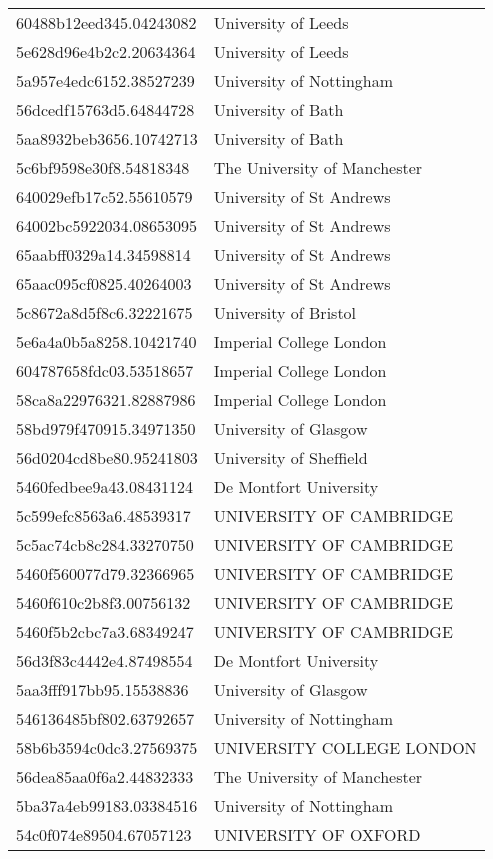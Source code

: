 \begin{tabular}{ll}
60488b12eed345.04243082 & University of Leeds \\
5e628d96e4b2c2.20634364 & University of Leeds \\
5a957e4edc6152.38527239 & University of Nottingham \\
56dcedf15763d5.64844728 & University of Bath \\
5aa8932beb3656.10742713 & University of Bath \\
5c6bf9598e30f8.54818348 & The University of Manchester \\
640029efb17c52.55610579 & University of St Andrews \\
64002bc5922034.08653095 & University of St Andrews \\
65aabff0329a14.34598814 & University of St Andrews \\
65aac095cf0825.40264003 & University of St Andrews \\
5c8672a8d5f8c6.32221675 & University of Bristol \\
5e6a4a0b5a8258.10421740 & Imperial College London \\
604787658fdc03.53518657 & Imperial College London \\
58ca8a22976321.82887986 & Imperial College London \\
58bd979f470915.34971350 & University of Glasgow \\
56d0204cd8be80.95241803 & University of Sheffield \\
5460fedbee9a43.08431124 & De Montfort University \\
5c599efc8563a6.48539317 & UNIVERSITY OF CAMBRIDGE \\
5c5ac74cb8c284.33270750 & UNIVERSITY OF CAMBRIDGE \\
5460f560077d79.32366965 & UNIVERSITY OF CAMBRIDGE \\
5460f610c2b8f3.00756132 & UNIVERSITY OF CAMBRIDGE \\
5460f5b2cbc7a3.68349247 & UNIVERSITY OF CAMBRIDGE \\
56d3f83c4442e4.87498554 & De Montfort University \\
5aa3fff917bb95.15538836 & University of Glasgow \\
546136485bf802.63792657 & University of Nottingham \\
58b6b3594c0dc3.27569375 & UNIVERSITY COLLEGE LONDON \\
56dea85aa0f6a2.44832333 & The University of Manchester \\
5ba37a4eb99183.03384516 & University of Nottingham \\
54c0f074e89504.67057123 & UNIVERSITY OF OXFORD \\

\end{tabular}
